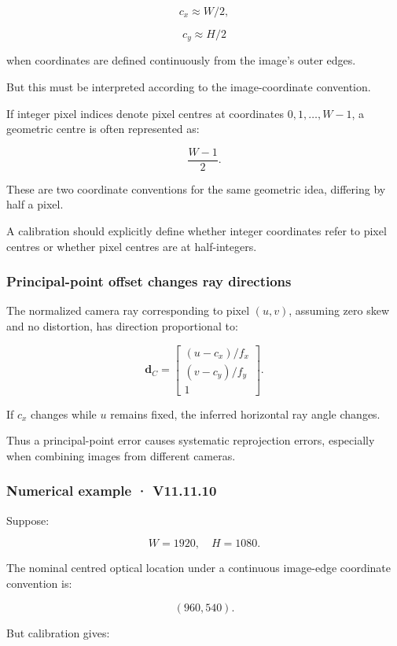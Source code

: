 \[
 c_x\approx W/2,
\]

\[
 c_y\approx H/2
\]

when coordinates are defined continuously from the image's outer edges.

But this must be interpreted according to the image-coordinate convention.

If integer pixel indices denote pixel centres at coordinates \(0,1,\ldots,W-1\), a geometric centre is often represented as:

\[
 \frac{W-1}{2}.
\]

These are two coordinate conventions for the same geometric idea, differing by half a pixel.

A calibration should explicitly define whether integer coordinates refer to pixel centres or whether pixel centres are at half-integers.

\subsubsection{Principal-point offset changes ray directions}\label{principal-point-offset-changes-ray-directions}

The normalized camera ray corresponding to pixel \((u,v)\), assuming zero skew and no distortion, has direction proportional to:

\[
 \boxed{ \mathbf d_C= \begin{bmatrix} (u-c_x)/f_x\\ (v-c_y)/f_y\\ 1 \end{bmatrix} }.
\]

If \(c_x\) changes while \(u\) remains fixed, the inferred horizontal ray angle changes.

Thus a principal-point error causes systematic reprojection errors, especially when combining images from different cameras.

\subsubsection{Numerical example · V11.11.10}\label{numerical-example-v11.11.10}

Suppose:

\[
 W=1920,\quad H=1080.
\]

The nominal centred optical location under a continuous image-edge coordinate convention is:

\[
 (960,540).
\]

But calibration gives:


